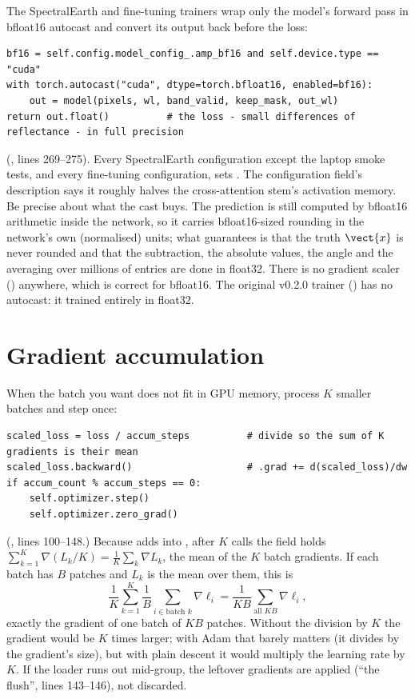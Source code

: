 The SpectralEarth and fine-tuning trainers wrap only the model's forward pass in bfloat16
autocast and convert its output back before the loss:
\begin{lstlisting}
bf16 = self.config.model_config_.amp_bf16 and self.device.type == "cuda"
with torch.autocast("cuda", dtype=torch.bfloat16, enabled=bf16):
    out = model(pixels, wl, band_valid, keep_mask, out_wl)
return out.float()          # the loss - small differences of reflectance - in full precision
\end{lstlisting}
(, lines 269--275). Every
SpectralEarth configuration except the laptop smoke tests, and every fine-tuning configuration,
sets .\newline
{}\newline
The configuration field's description says it roughly halves the cross-attention stem's activation
memory. Be precise about what the cast buys. The prediction is still computed by bfloat16 arithmetic
inside the network, so it carries bfloat16-sized rounding in the network's own (normalised)
units; what  guarantees is that the truth $\vect{x}$ is never rounded and that
the subtraction, the absolute values, the angle and the averaging over millions of entries are
done in float32. There is no gradient scaler () anywhere, which is correct for
bfloat16. The original v0.2.0 trainer ()
has no autocast: it trained entirely in float32.

\section{Gradient accumulation}\label{sec:trainloop:accum}

When the batch you want does not fit in GPU memory, process $K$ smaller batches and step once:
\begin{lstlisting}
scaled_loss = loss / accum_steps          # divide so the sum of K gradients is their mean
scaled_loss.backward()                    # .grad += d(scaled_loss)/dw
if accum_count % accum_steps == 0:
    self.optimizer.step()
    self.optimizer.zero_grad()
\end{lstlisting}
(, lines 100--148.)
Because  adds into , after $K$ calls the field holds
$\sum_{k=1}^{K}\nabla(L_k/K) = \frac{1}{K}\sum_k \nabla L_k$, the mean of the $K$ batch
gradients. If each batch has $B$ patches and $L_k$ is the mean over them, this is
\[
\frac{1}{K}\sum_{k=1}^{K}\frac{1}{B}\sum_{i \in \text{batch }k}\nabla\ell_i = \frac{1}{KB}\sum_{\text{all }KB}\nabla\ell_i,
\]
exactly the gradient of one batch of $KB$ patches. Without the division by $K$ the gradient
would be $K$ times larger; with Adam that barely matters (it divides by the gradient's size), but
with plain descent it would multiply the learning rate by $K$. If the loader runs out mid-group,
the leftover gradients are applied (``the flush'', lines 143--146), not discarded.

